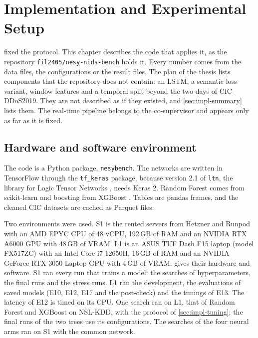 \chapter{Implementation and Experimental Setup}
\label{ch:implementation}

 fixed the protocol. This chapter describes the code that
applies it, as the repository \texttt{fil2405/nesy-nids-bench} holds it. Every number comes
from the data files, the configurations or the result files. The plan of the thesis lists
components that the repository does not contain: an LSTM, a semantic-loss variant, window
features and a temporal split beyond the two days of CIC-DDoS2019. They are not described as if
they existed, and \cref{sec:impl-summary} lists them. The real-time pipeline belongs to the
co-supervisor and appears only as far as it is fixed.

\section{Hardware and software environment}
\label{sec:impl-environment}

The code is a Python package, \texttt{nesybench}. The networks are written in TensorFlow
\citep{abadi2016tensorflow} through the \texttt{tf\_keras} package, because version 2.1 of
\texttt{ltn}, the library for Logic Tensor Networks \citep{badreddine2022ltn}, needs Keras 2.
Random Forest comes from scikit-learn \citep{pedregosa2011scikit} and boosting from XGBoost
\citep{chen2016xgboost}. Tables are pandas frames, and the cleaned CIC datasets are cached as
Parquet files.

Two environments were used. S1 is the rented servers from Hetzner and Runpod with an AMD EPYC CPU of 48 vCPU, 192\,GB of RAM and an NVIDIA RTX A6000 GPU with 48\,GB of VRAM. L1 is an ASUS TUF Dash F15 laptop (model FX517ZC) with an Intel Core i7-12650H, 16\,GB of RAM and an NVIDIA GeForce RTX 3050 Laptop GPU with 4\,GB of VRAM.  gives their hardware and software. S1 ran every run that
trains a model: the searches of hyperparameters, the final runs and the stress runs. L1
ran the development, the evaluations of saved models (E10, E12, E17 and the post-check) and the
timings of E13. The latency of E12 is timed on its CPU. One search ran on L1,
that of Random Forest and XGBoost on NSL-KDD, with the protocol of \cref{sec:impl-tuning}; the
final runs of the two trees use its configurations. The searches of the four neural arms ran on
S1 with the common network.


